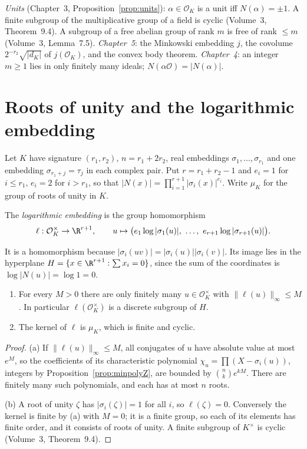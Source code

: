 \begin{reminder}
\emph{Units} (Chapter~3, Proposition~\ref{prop:units}): $\alpha\in\mathcal O_K$ is a unit iff $N(\alpha)=\pm1$. A finite
subgroup of the multiplicative group of a field is cyclic (Volume~3, Theorem~9.4). A subgroup of a free abelian group of
rank $m$ is free of rank $\le m$ (Volume~3, Lemma~7.5). \emph{Chapter~5}: the Minkowski embedding $j$, the covolume
$2^{-r_2}\sqrt{|d_K|}$ of $j(\mathcal O_K)$, and the convex body theorem. \emph{Chapter~4}: an integer $m\ge1$ lies in only
finitely many ideals; $N(\alpha\mathcal O)=|N(\alpha)|$.
\end{reminder}

\section{Roots of unity and the logarithmic embedding}

Let $K$ have signature $(r_1,r_2)$, $n=r_1+2r_2$, real embeddings $\sigma_1,\dots,\sigma_{r_1}$ and one embedding $\sigma_{r_1+j}=\tau_j$ in
each complex pair. Put $r=r_1+r_2-1$ and $e_i=1$ for $i\le r_1$, $e_i=2$ for $i>r_1$, so that $|N(x)|=\prod_{i=1}^{r+1}
|\sigma_i(x)|^{e_i}$. Write $\mu_K$ for the group of roots of unity in $K$.

\begin{definition}
The \emph{logarithmic embedding} is the group homomorphism
\[
\ell:\mathcal O_K^\times\to\R^{r+1},\qquad u\mapsto\bigl(e_1\log|\sigma_1(u)|,\ \dots,\ e_{r+1}\log|\sigma_{r+1}(u)|\bigr).
\]
\end{definition}

It is a homomorphism because $|\sigma_i(uv)|=|\sigma_i(u)||\sigma_i(v)|$. Its image lies in the hyperplane
$H=\{x\in\R^{r+1}:\sum x_i=0\}$, since the sum of the coordinates is $\log|N(u)|=\log1=0$.

\begin{proposition}\label{prop:logkernel}
\begin{enumerate}[label=(\alph*)]
\item For every $M>0$ there are only finitely many $u\in\mathcal O_K^\times$ with $\|\ell(u)\|_\infty\le M$. In particular
$\ell(\mathcal O_K^\times)$ is a discrete subgroup of $H$.
\item The kernel of $\ell$ is $\mu_K$, which is finite and cyclic.
\end{enumerate}
\end{proposition}
\begin{proof}
(a) If $\|\ell(u)\|_\infty\le M$, all conjugates of $u$ have absolute value at most $e^M$, so the coefficients of its
characteristic polynomial $\chi_u=\prod(X-\sigma_i(u))$, integers by Proposition~\ref{prop:minpolyZ}, are bounded by
$\binom nke^{kM}$. There are finitely many such polynomials, and each has at most $n$ roots.

(b) A root of unity $\zeta$ has $|\sigma_i(\zeta)|=1$ for all $i$, so $\ell(\zeta)=0$. Conversely the kernel is finite by
(a) with $M=0$; it is a finite group, so each of its elements has finite order, and it consists of roots of unity. A
finite subgroup of $K^\times$ is cyclic (Volume~3, Theorem~9.4).
\end{proof}

